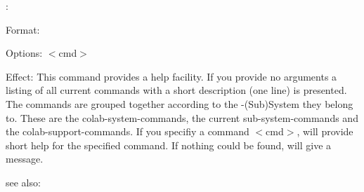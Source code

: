 \colab{} \?:

Format: 

Options: $<$cmd$>$

Effect: This command provides a help facility. If you provide no
        arguments a listing of all current commands with a short 
        description (one line) is presented. The commands are grouped
        together according to the \COLAB{}-(Sub)System they belong to.
        These are the colab-system-commands, the current 
        sub-system-commands and the colab-support-commands.
	If you specifiy a command $<$cmd$>$, \COLAB{} will provide short
	help for the specified command. If nothing could be found,
	\COLAB{} will give a message.

see also: \help
